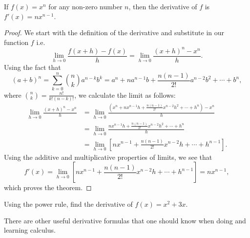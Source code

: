 \begin{prop}\label{PowRule}
	If $f(x)=x^n$ for any non-zero number $n$, then the derivative of $f$ is  $f'(x)=nx^{n-1}$.
\end{prop}
\begin{proof}
	We start with the definition of the derivative and substitute in our function $f$ i.e.
	\begin{equation}
		\lim\limits_{h\to 0}\frac{f(x+h)-f(x)}{h}
=	\lim\limits_{h\to 0}\frac{(x+h)^n-x^n}{h}.
	\end{equation}
	Using the fact that \begin{equation}
		(a+b)^n=\sum^n_{k=0} \binom{n}{k}a^{n-k}b^k=a^n+na^{n-1}b+ \frac{n(n-1)}{2!}a^{n-2}b^2+\dotsb+b^n,
	\end{equation}
	where $\binom{n}{k}=\frac{n!}{k!(n-k)!}$,
	we calculate the limit as follows:
	\begin{align}
		\lim\limits_{h\to 0}\frac{(x+h)^n-x^n}{h}&=\lim\limits_{h\to 0}\frac{(x^n+nx^{n-1}h+ \frac{n(n-1)}{2!}x^{n-2}h^2+\dotsb+h^n)-x^n}{h}\\
	&=\lim\limits_{h\to 0}\frac{nx^{n-1}h+ \frac{n(n-1)}{2!}x^{n-2}h^2+\dotsb+h^n}{h}\\
	& =\lim\limits_{h\to 0} \left[ nx^{n-1}+ \frac{n(n-1)}{2!}x^{n-2}h+\dotsb+h^{n-1}\right] .
	\end{align}
Using the additive and multiplicative properties of limits, we see that
\begin{equation}
	f'(x)=\lim\limits_{h\to 0} \left[nx^{n-1}+ \frac{n(n-1)}{2!}x^{n-2}h+\dotsb+h^{n-1}\right]=nx^{n-1},
\end{equation}
which proves the theorem.
\end{proof}


\begin{exmp}
	Using the power rule, find the derivative of $f(x)=x^2+3x$.
\end{exmp}



There are other useful derivative formulas that one should know when doing and learning calculus.

